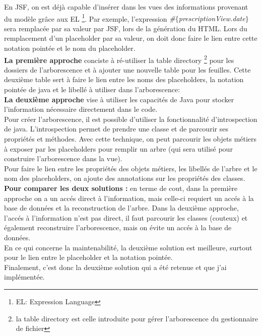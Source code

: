En JSF, on est déjà capable d'insérer dans les vues des informations provenant du modèle grâce aux EL \footnote{EL: Expression Language}. Par exemple, l'expression \textit{\#$\{$prescriptionView.date$\}$} sera remplacée par sa valeur par JSF, lors de la génération du HTML. Lors du remplacement d'un placeholder par sa valeur, on doit donc faire le lien entre cette notation pointée et le nom du placeholder.\\

\textbf{La première approche} conciste à ré-utiliser la table directory \footnote{la table directory est celle introduite pour gérer l'arborescence du gestionnaire de fichier} pour les dossiers de l'arborescence et à ajouter une nouvelle table pour les feuilles. Cette deuxième table sert à faire le lien entre les noms des placeholders, la notation pointée de java et le libellé à utiliser dans l'arborescence:\\


\textbf{La deuxième approche} vise à utiliser les capacités de Java pour stocker l'information nécessaire directement dans le code.\\
Pour créer l'arborescence, il est possible d'utiliser la fonctionnalité d'introspection de java. L'introspection permet de prendre une classe et de parcourir ses propriétés et méthodes. Avec cette technique, on peut parcourir les objets métiers à exposer par les placeholders pour remplir un arbre (qui sera utilisé pour construire l'arborescence dans la vue). \\
Pour faire le lien entre les propriétés des objets métiers, les libellés de l'arbre et le nom des placeholders, on ajoute des annotations sur les propriétés des classes.\\

\textbf{Pour comparer les deux solutions :} en terme de cout, dans la première approche on a un accés direct à l'information, mais celle-ci requiert un accés à la base de données et la reconstruction de l'arbre. Dans la deuxième approche, l'accés à l'information n'est pas direct, il faut parcourir les classes (couteux) et également reconstruire l'arborescence, mais on évite un accés à la base de données.\\
En ce qui concerne la maintenabilité, la deuxième solution est meilleure, surtout pour le lien entre le placeholder et la notation pointée.\\
Finalement, c'est donc la deuxième solution qui a été retenue et que j'ai implémentée.


